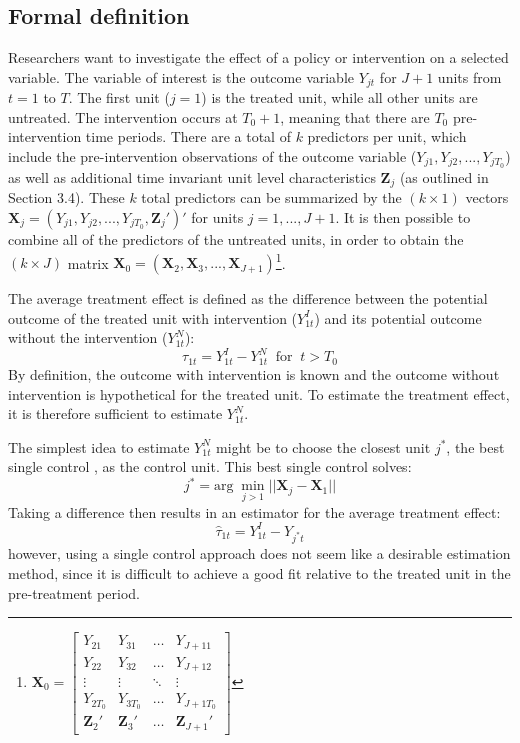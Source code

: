 \documentclass{scrbook}
\begin{document}
\subsection*{Formal definition}

Researchers want to investigate the effect of a policy or intervention
on a selected variable. The variable of interest is the outcome variable
\(Y_{jt}\) for \(J + 1\) units from \(t=1\) to \(T\). The first unit
(\(j = 1\)) is the treated unit, while all other units are untreated.
The intervention occurs at \(T_{0}+1\), meaning that there are \(T_{0}\)
pre-intervention time periods. There are a total of \(k\) predictors per
unit, which include the pre-intervention observations of the outcome
variable (\(Y_{j1},Y_{j2},...,Y_{jT_{0}}\)) as well as additional time
invariant unit level characteristics \(\mathbf{Z}_{j}\) (as outlined in
Section 3.4). These \(k\) total predictors can be summarized by the
\((k\times 1)\) vectors
\(\mathbf{X}_{j}=(Y_{j1},Y_{j2},...,Y_{jT_{0}},\mathbf{Z}_{j}')'\) for
units \(j=1,...,J + 1\). It is then possible to combine all of the
predictors of the untreated units, in order to obtain the
\((k\times J)\) matrix
\(\mathbf{X}_{0}=(\mathbf{X}_{2},\mathbf{X}_{3},...,\mathbf{X}_{J + 1})\)\footnote{\(\mathbf{X}_0=
\begin{bmatrix}
Y_{21} & Y_{31} & \dots & Y_{J+11}\\
Y_{22} & Y_{32} & \dots & Y_{J+12}\\
\vdots & \vdots & \ddots & \vdots\\
Y_{2T_{0}} & Y_{3T_{0}} & \dots & Y_{J+1T_{0}}\\
\mathbf{Z}_{2}' & \mathbf{Z}_{3}' & \dots & \mathbf{Z}_{J + 1}'
\end{bmatrix}\)}.

The average treatment effect is defined as the difference between the
potential outcome of the treated unit with intervention (\(Y_{1t}^{I}\))
and its potential outcome without the intervention (\(Y_{1t}^{N}\)):
\begin{equation}
\tau_{1t}=Y_{1t}^{I}-Y_{1t}^{N}\; \; \text{for}\; \; t>T_{0}
\end{equation} By definition, the outcome with intervention is known and
the outcome without intervention is hypothetical for the treated unit.
To estimate the treatment effect, it is therefore sufficient to estimate
\(Y_{1t}^{N}\).

The simplest idea to estimate \(Y_{1t}^{N}\) might be to choose the
closest unit \(j^{*}\), the best single control
\parencite{doudchenko_balancing_2016}, as the control unit. This best
single control solves: \begin{equation}
j^{*}=\text{arg}\; \min_{j>1}\vert\vert\mathbf{X}_{j}-\mathbf{X}_{1}\vert\vert
\end{equation} Taking a difference then results in an estimator for the
average treatment effect: \begin{equation}
\hat{\tau}_{1t}=Y_{1t}^{I}-Y_{j^{*}t}
\end{equation} however, using a single control approach does not seem
like a desirable estimation method, since it is difficult to achieve a
good fit relative to the treated unit in the pre-treatment period.
\end{document}
